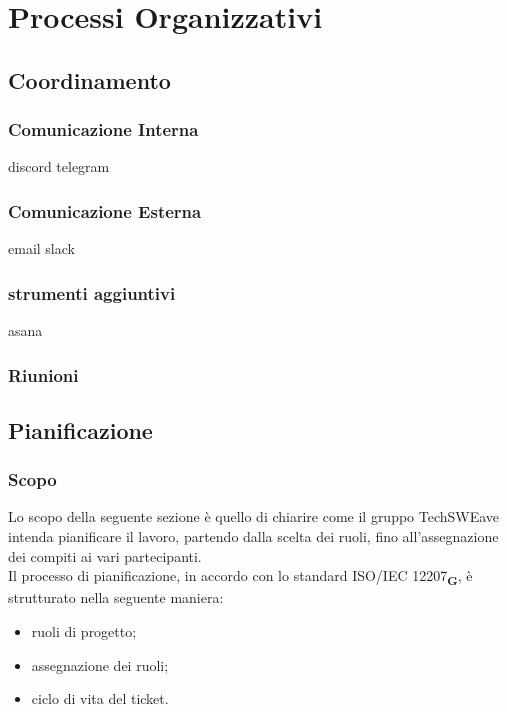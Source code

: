 \section{Processi Organizzativi}
\subsection{Coordinamento}
\subsubsection{Comunicazione Interna}
discord
telegram
\subsubsection{Comunicazione Esterna}
email
slack
\subsubsection{strumenti aggiuntivi}
asana
\subsubsection{Riunioni}
\subsection{Pianificazione}
\subsubsection{Scopo}
Lo scopo della seguente sezione è quello di chiarire come il gruppo TechSWEave intenda pianificare il lavoro, partendo dalla scelta dei ruoli, fino all'assegnazione dei compiti ai vari partecipanti.\\
Il processo di pianificazione, in accordo con lo standard ISO/IEC 12207\textsubscript{\textbf{G}}, è strutturato nella seguente maniera:
\begin {itemize}
    \item ruoli di progetto;
    \item assegnazione dei ruoli;
    \item ciclo di vita del ticket.
\end {itemize}
